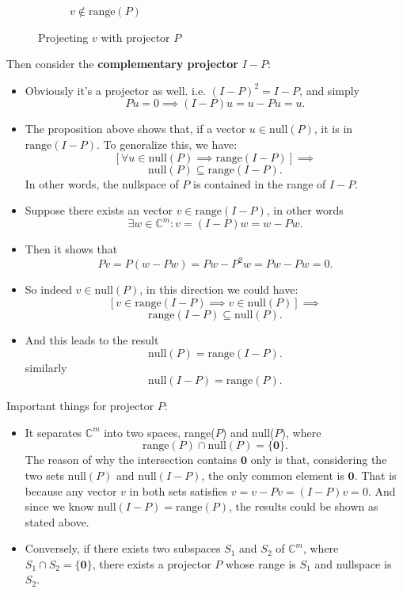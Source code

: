 \begin{itemize}
\begin{figure}[H]
\begin{subfigure}[b]{0.5\textwidth}
      \caption{$v \notin \text{range}(P)$}
      \label{outrange}
    \end{subfigure}
    \caption{Projecting $v$ with projector $P$}
  \end{figure}
\end{itemize}
Then consider the \textbf{complementary projector} $I - P$:
\begin{itemize}
  \item Obviously it's a projector as well. i.e. $(I - P)^2 = I - P$, and simply
    \[
      Pu = 0 \implies (I - P)u = u - Pu = u
    .\]
  \item The proposition above shows that, if a vector $u \in \text{null}(P)$, it is in $\text{range}(I - P)$. To generalize this, we have:
    \[
      [\forall u \in \text{null}(P) \implies \text{range}(I - P)] \implies
    \]
    \[
      \text{null}(P) \subseteq \text{range}(I - P)
    .\] 
    In other words, the nullspace of $P$ is contained in the range of $I - P$.
  \item Suppose there exists an vector $v \in \text{range}(I - P)$, in other words
    \[
      \exists w \in \mathbb{C}^{m}: v = (I - P)w = w - Pw
    .\]
  \item Then it shows that
    \[
      Pv = P(w - Pw) = Pw - P^2w = Pw - Pw = 0
    .\] 
  \item So indeed $v \in \text{null}(P)$, in this direction we could have:
    \[
      [v \in \text{range}(I - P) \implies v \in \text{null}(P)] \implies
    \]
    \[
      \text{range}(I - P) \subseteq \text{null}(P)
    .\]
    \item And this leads to the result
      \[
        \text{null}(P) = \text{range}(I - P)
      .\]
      similarly
      \[
        \text{null}(I - P) = \text{range}(P)
      .\] 
\end{itemize}
Important things for projector $P$: 
\begin{itemize}
\item  It separates  $\mathbb{C}^{m}$ into two spaces, range($P$) and null($P$), where 
  \[
  \text{range}(P) \cap \text{null}(P) = \{\textbf{0}\}
  .\] 
  The reason of why the intersection contains $\textbf{0}$ only is that, considering the two sets $\text{null}(P)$ and $\text{null}(I - P)$, the only common element is $\textbf{0}$. That is because any vector $v$ in both sets satisfies $v = v - Pv = (I - P)v = 0$. And since we know $\text{null}(I - P) = \text{range}(P)$, the results could be shown as stated above. 

\item Conversely, if there exists two subspaces $S_1$ and $S_2$ of $\mathbb{C}^{m}$, where $S_1 \cap S_2 = \{\textbf{0}\}$, there exists a projector $P$ whose range is $S_1$ and nullspace is $S_2$.
\end{itemize}
